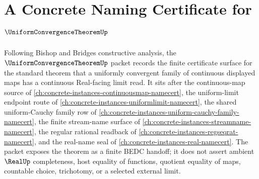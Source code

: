\chapter{A Concrete Naming Certificate for $\UniformConvergenceTheoremUp$}
\label{ch:concrete-instances-uniform-convergence-theorem-namecert}

Following Bishop and Bridges constructive analysis, the $\UniformConvergenceTheoremUp$ packet records the finite certificate surface for the standard theorem that a uniformly convergent family of continuous displayed maps has a continuous Real-facing limit read. It sits after the continuous-map source of \autoref{ch:concrete-instances-continuousmap-namecert}, the uniform-limit endpoint route of \autoref{ch:concrete-instances-uniformlimit-namecert}, the shared uniform-Cauchy family row of \autoref{ch:concrete-instances-uniform-cauchy-family-namecert}, the finite stream-name surface of \autoref{ch:concrete-instances-streamname-namecert}, the regular rational readback of \autoref{ch:concrete-instances-regseqrat-namecert}, and the real-name seal of \autoref{ch:concrete-instances-real-namecert}. The packet exposes the theorem as a finite BEDC handoff; it does not assert ambient $\RealUp$ completeness, host equality of functions, quotient equality of maps, countable choice, trichotomy, or a selected external limit.

